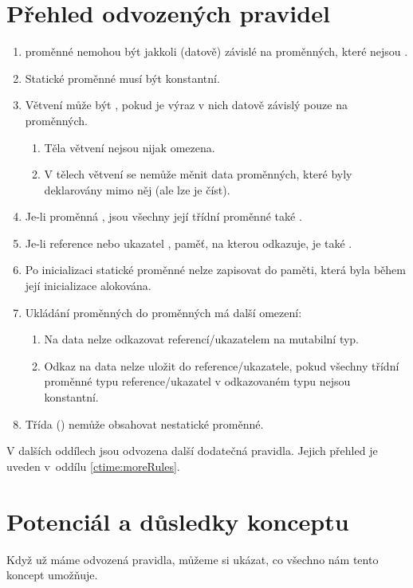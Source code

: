 \section{Přehled odvozených pravidel} \label{ctime:rules}
\begin{enumerate}
	\item \ctime proměnné nemohou být jakkoli (datově) závislé na proměnných, které nejsou \ctime. 
	\item Statické \ctime proměnné musí být konstantní.
	\item Větvení může být \ctime, pokud je výraz v nich datově závislý pouze na \ctime proměnných.
	\begin{enumerate}
		\item Těla \ctime větvení nejsou nijak omezena.
		\item V tělech \nonctime větvení se nemůže měnit data \ctime proměnných, které byly deklarovány mimo něj (ale lze je číst).
	\end{enumerate}
	\item Je-li proměnná \ctime, jsou všechny její třídní proměnné také \ctime.
	\item Je-li reference nebo ukazatel \ctime, paměť, na kterou odkazuje, je také \ctime.
	\item Po inicializaci statické \ctime proměnné nelze zapisovat do paměti, která byla během její inicializace alokována.
	\item Ukládání \ctime proměnných do \nonctime proměnných má další omezení:
	\begin{enumerate}
		\item Na \ctime data nelze odkazovat \nonctime referencí/ukazatelem na mutabilní typ.
		\item Odkaz na \ctime data nelze uložit do \nonctime reference/ukazatele, pokud všechny třídní proměnné typu reference/ukazatel v odkazovaném typu nejsou konstantní.
	\end{enumerate}
	\item Třída (\nonctime) nemůže obsahovat nestatické \ctime proměnné.
\end{enumerate}

V dalších oddílech jsou odvozena další dodatečná pravidla. Jejich přehled je uveden v~oddílu \ref{ctime:moreRules}.

\section{Potenciál a důsledky konceptu}
Když už máme odvozená pravidla, můžeme si ukázat, co všechno nám tento koncept umožňuje.

